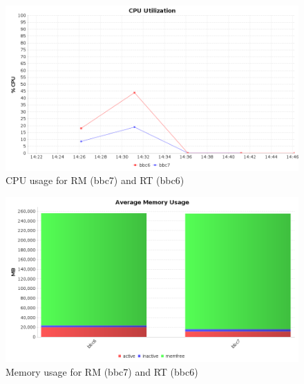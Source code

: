 \begin{figure}
\centering
\includegraphics[scale=0.4]{resources/images/Evaluation/RM_RT_cpu_utilization.png}
\caption{CPU usage for RM (bbc7) and RT (bbc6)}
\label{fig:ev_cpu_util_rm_rt}
\end{figure}

\begin{figure}
\centering
\includegraphics[scale=0.4]{resources/images/Evaluation/RM_RT_memory_usage.png}
\caption{Memory usage for RM (bbc7) and RT (bbc6)}
\label{fig:ev_mem_consumption_rm_rt}
\end{figure}
